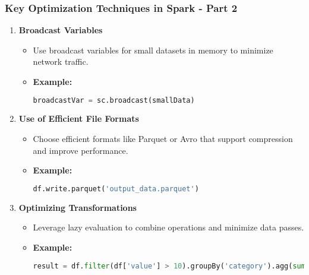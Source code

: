 \documentclass[aspectratio=169]{beamer}
\begin{document}
\begin{frame}
    \frametitle{Key Optimization Techniques in Spark - Part 2}
    \begin{enumerate}
        \item \textbf{Broadcast Variables}
            \begin{itemize}
                \item Use broadcast variables for small datasets in memory to minimize network traffic.
                \item \textbf{Example:}
                \begin{lstlisting}[language=Python]
broadcastVar = sc.broadcast(smallData)
                \end{lstlisting}
            \end{itemize}
        \item \textbf{Use of Efficient File Formats}
            \begin{itemize}
                \item Choose efficient formats like Parquet or Avro that support compression and improve performance.
                \item \textbf{Example:}
                \begin{lstlisting}[language=Python]
df.write.parquet('output_data.parquet')
                \end{lstlisting}
            \end{itemize}
        \item \textbf{Optimizing Transformations}
            \begin{itemize}
                \item Leverage lazy evaluation to combine operations and minimize data passes.
                \item \textbf{Example:}
                \begin{lstlisting}[language=Python]
result = df.filter(df['value'] > 10).groupBy('category').agg(sum('value'))
                \end{lstlisting}
            \end{itemize}
    \end{enumerate}
\end{frame}
\end{document}
